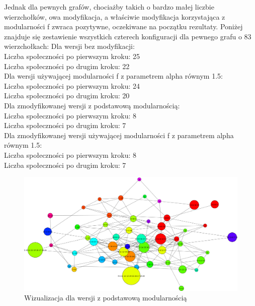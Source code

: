 \documentclass{article}
\begin{document}
Jednak dla pewnych grafów, chociażby takich o bardzo małej liczbie wierzchołków, owa modyfikacja, a właściwie modyfikacja korzystająca z modularności f zwraca pozytywne, oczekiwane na początku rezultaty. Poniżej znajduje się zestawienie wszystkich czterech konfiguracji dla pewnego grafu o 83 wierzchołkach:
Dla wersji bez modyfikacji:\\
Liczba społeczności po pierwszym kroku: 25\\
Liczba społeczności po drugim kroku: 22\\
Dla wersji używającej modularności f z parametrem alpha równym 1.5:\\
Liczba społeczności po pierwszym kroku: 24\\
Liczba społeczności po drugim kroku: 20\\
Dla zmodyfikowanej wersji z podstawową modularnością:\\
Liczba społeczności po pierwszym kroku: 8\\
Liczba społeczności po drugim kroku: 7\\
Dla zmodyfikowanej wersji używającej modularności f z parametrem alpha równym 1.5:\\
Liczba społeczności po pierwszym kroku: 8\\
Liczba społeczności po drugim kroku: 7\\

\begin{figure}[H]
\centering
\includegraphics[width=\textwidth]{images/bt-sample-5.png}
\caption{Wizualizacja dla wersji z podstawową modularnością}
\end{figure}
\end{document}

